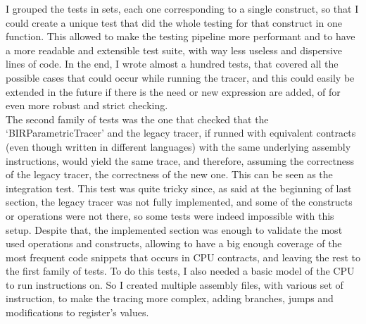 I grouped the tests in sets, each one corresponding to a single construct, so that
I could create a unique test that did the whole testing for that construct in one
function. This allowed to make the testing pipeline more performant and to have
a more readable and extensible test suite, with way less useless and dispersive lines
of code. In the end, I wrote almost a hundred tests, that covered all the
possible cases that could occur while running the tracer, and this could easily be
extended in the future if there is the need or new expression are added, of for
even more robust and strict checking. \\

The second family of tests was the one that checked that the `BIRParametricTracer'
and the legacy tracer, if runned with equivalent contracts (even though written
in different languages) with the same underlying assembly instructions, would
yield the same trace, and therefore, assuming the correctness of the legacy
tracer, the correctness of the new one. This can be seen as the integration test.
This test was quite tricky since, as said at the beginning of last section, the legacy
tracer was not fully implemented, and some of the constructs or operations were
not there, so some tests were indeed impossible with this setup. Despite that, the
implemented section was enough to validate the most used operations and constructs,
allowing to have a big enough coverage of the most frequent code snippets that
occurs in CPU contracts, and leaving the rest to the first family of tests. To
do this tests, I also needed a basic model of the CPU to run instructions on. So
I created multiple assembly files, with various set of instruction, to make the
tracing more complex, adding branches, jumps and modifications to register's
values.

